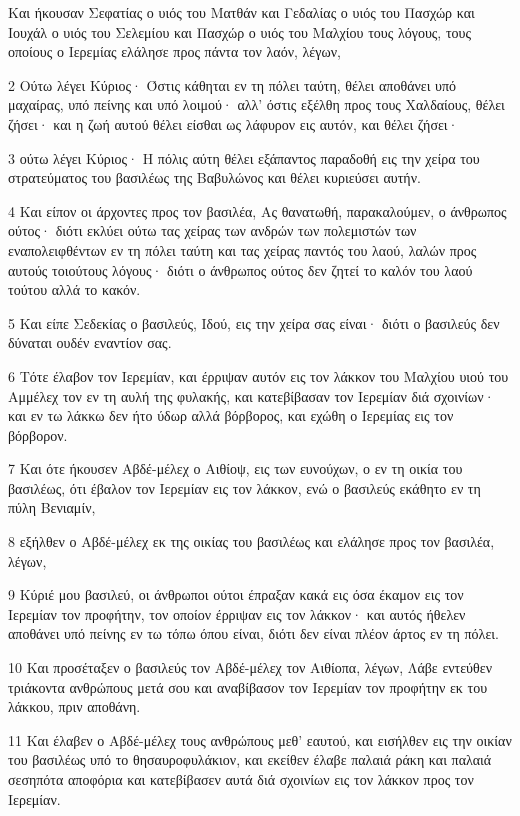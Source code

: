 \par Και ήκουσαν Σεφατίας ο υιός του Ματθάν και Γεδαλίας ο υιός του Πασχώρ και Ιουχάλ ο υιός του Σελεμίου και Πασχώρ ο υιός του Μαλχίου τους λόγους, τους οποίους ο Ιερεμίας ελάλησε προς πάντα τον λαόν, λέγων,
\par 2 Ούτω λέγει Κύριος· Όστις κάθηται εν τη πόλει ταύτη, θέλει αποθάνει υπό μαχαίρας, υπό πείνης και υπό λοιμού· αλλ' όστις εξέλθη προς τους Χαλδαίους, θέλει ζήσει· και η ζωή αυτού θέλει είσθαι ως λάφυρον εις αυτόν, και θέλει ζήσει·
\par 3 ούτω λέγει Κύριος· Η πόλις αύτη θέλει εξάπαντος παραδοθή εις την χείρα του στρατεύματος του βασιλέως της Βαβυλώνος και θέλει κυριεύσει αυτήν.
\par 4 Και είπον οι άρχοντες προς τον βασιλέα, Ας θανατωθή, παρακαλούμεν, ο άνθρωπος ούτος· διότι εκλύει ούτω τας χείρας των ανδρών των πολεμιστών των εναπολειφθέντων εν τη πόλει ταύτη και τας χείρας παντός του λαού, λαλών προς αυτούς τοιούτους λόγους· διότι ο άνθρωπος ούτος δεν ζητεί το καλόν του λαού τούτου αλλά το κακόν.
\par 5 Και είπε Σεδεκίας ο βασιλεύς, Ιδού, εις την χείρα σας είναι· διότι ο βασιλεύς δεν δύναται ουδέν εναντίον σας.
\par 6 Τότε έλαβον τον Ιερεμίαν, και έρριψαν αυτόν εις τον λάκκον του Μαλχίου υιού του Αμμέλεχ τον εν τη αυλή της φυλακής, και κατεβίβασαν τον Ιερεμίαν διά σχοινίων· και εν τω λάκκω δεν ήτο ύδωρ αλλά βόρβορος, και εχώθη ο Ιερεμίας εις τον βόρβορον.
\par 7 Και ότε ήκουσεν Αβδέ-μέλεχ ο Αιθίοψ, εις των ευνούχων, ο εν τη οικία του βασιλέως, ότι έβαλον τον Ιερεμίαν εις τον λάκκον, ενώ ο βασιλεύς εκάθητο εν τη πύλη Βενιαμίν,
\par 8 εξήλθεν ο Αβδέ-μέλεχ εκ της οικίας του βασιλέως και ελάλησε προς τον βασιλέα, λέγων,
\par 9 Κύριέ μου βασιλεύ, οι άνθρωποι ούτοι έπραξαν κακά εις όσα έκαμον εις τον Ιερεμίαν τον προφήτην, τον οποίον έρριψαν εις τον λάκκον· και αυτός ήθελεν αποθάνει υπό πείνης εν τω τόπω όπου είναι, διότι δεν είναι πλέον άρτος εν τη πόλει.
\par 10 Και προσέταξεν ο βασιλεύς τον Αβδέ-μέλεχ τον Αιθίοπα, λέγων, Λάβε εντεύθεν τριάκοντα ανθρώπους μετά σου και αναβίβασον τον Ιερεμίαν τον προφήτην εκ του λάκκου, πριν αποθάνη.
\par 11 Και έλαβεν ο Αβδέ-μέλεχ τους ανθρώπους μεθ' εαυτού, και εισήλθεν εις την οικίαν του βασιλέως υπό το θησαυροφυλάκιον, και εκείθεν έλαβε παλαιά ράκη και παλαιά σεσηπότα αποφόρια και κατεβίβασεν αυτά διά σχοινίων εις τον λάκκον προς τον Ιερεμίαν.
